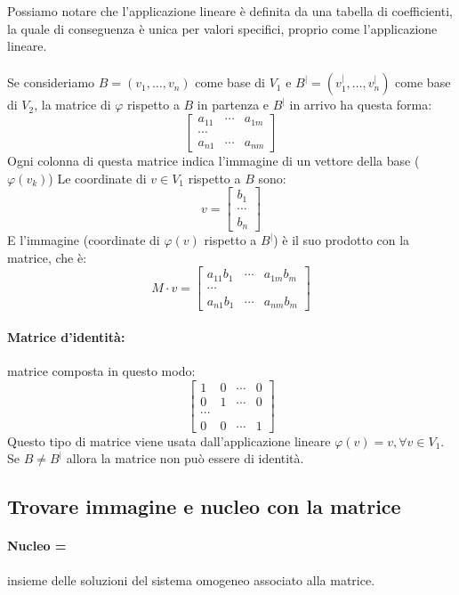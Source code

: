 \documentclass[12pt,a4paper]{article}
\begin{document}
Possiamo notare che l'applicazione lineare è definita da una tabella di coefficienti, la quale di conseguenza è unica per valori specifici, proprio come l'applicazione lineare.\\\\
Se consideriamo $B = (v_1,\ldots,v_n)$ come base di $V_1$ e $B^| = (v_1^|,\ldots,v_n^|)$ come base di $V_2$, la matrice di $\varphi$  rispetto a $B$ in partenza e $B^|$ in arrivo ha questa forma:
\[
\begin{bmatrix}
  a_{11} & \cdots & a_{1m}\\
  \cdots\\
  a_{n1} & \cdots & a_{nm}
\end{bmatrix}
\]
Ogni colonna di questa matrice indica l'immagine di un vettore della base ($\varphi(v_k)$)
Le coordinate di $v \in V_1$ rispetto a $B$ sono:
\[
v = \begin{bmatrix}
  b_1\\
  \cdots\\
  b_n
\end{bmatrix}
\]
E l'immagine (coordinate di $\varphi(v)$ rispetto a $B^|$) è il suo prodotto con la matrice, che è:
\[
M \cdot v = \begin{bmatrix}
  a_{11}b_1 & \cdots & a_{1m}b_m\\
  \cdots\\
  a_{n1}b_1 & \cdots & a_{nm}b_m
\end{bmatrix}
\]
\paragraph{Matrice d'identità:} matrice composta in questo modo:
\[
\begin{bmatrix}
  1 & 0 & \cdots & 0\\
  0 & 1 & \cdots & 0\\
  \cdots\\
  0 & 0 & \cdots & 1
\end{bmatrix}
\]
Questo tipo di matrice viene usata dall'applicazione lineare $\varphi(v) = v, \forall v \in V_1$.\\
Se $B \ne B^|$ allora la matrice non può essere di identità.
\subsection{Trovare immagine e nucleo con la matrice}
\paragraph{Nucleo =} insieme delle soluzioni del sistema omogeneo associato alla matrice.
\end{document}
